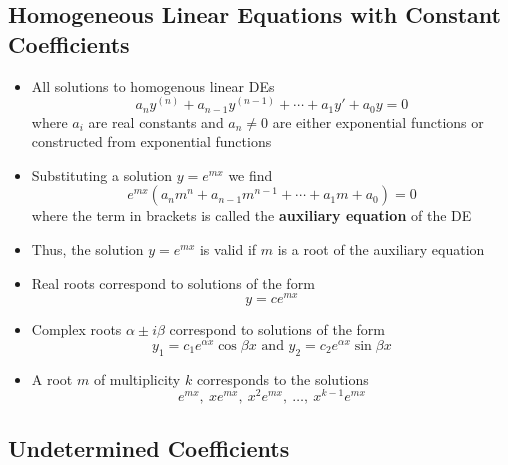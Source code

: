 \documentclass{article}
\begin{document}
\subsection{Homogeneous Linear Equations with Constant Coefficients}

\begin{itemize}
  \item All solutions to homogenous linear DEs \[a_n y^{(n)} + a_{n - 1} y^{(n - 1)} + \cdots + a_1 y' + a_0 y = 0\] where $a_i$ are real constants and $a_n \ne 0$ are either exponential functions or constructed from exponential functions

  \item Substituting a solution $y = e^{mx}$ we find \[e^{mx} (a_n m^n + a_{n - 1} m^{n - 1} + \cdots + a_1 m + a_0) = 0\] where the term in brackets is called the \textbf{auxiliary equation} of the DE

  \item Thus, the solution $y = e^{mx}$ is valid if $m$ is a root of the auxiliary equation

  \item Real roots correspond to solutions of the form \[y = c e^{mx}\]

  \item Complex roots $\alpha \pm i \beta$ correspond to solutions of the form \[y_1 = c_1 e^{\alpha x} \cos \beta x \text{ and } y_2 = c_2 e^{\alpha x} \sin \beta x\]

  \item A root $m$ of multiplicity $k$ corresponds to the solutions \[e^{m x}, \: x e^{mx}, \: x^2 e^{mx}, \: \ldots, \: x^{k - 1} e^{mx}\]
\end{itemize}

\subsection{Undetermined Coefficients}
\end{document}
